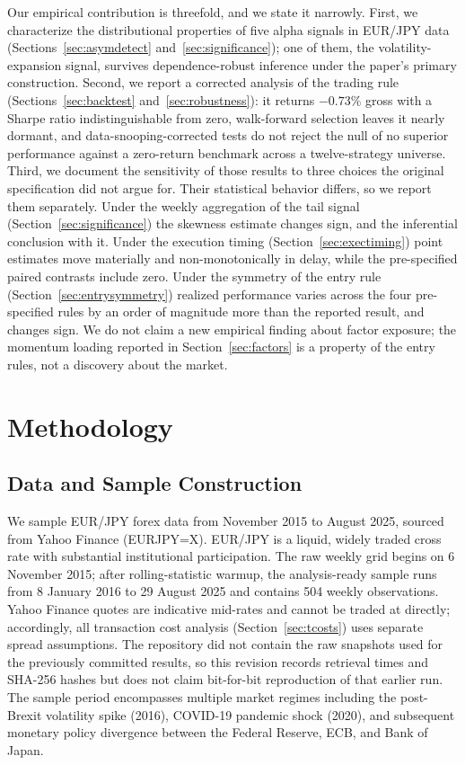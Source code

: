 \documentclass[11pt]{article}
\begin{document}
Our empirical contribution is threefold, and we state it narrowly. First, we characterize the distributional properties of five alpha signals in EUR/JPY data (Sections~\ref{sec:asymdetect} and~\ref{sec:significance}); one of them, the volatility-expansion signal, survives dependence-robust inference under the paper's primary construction. Second, we report a corrected analysis of the trading rule (Sections~\ref{sec:backtest} and~\ref{sec:robustness}): it returns $-0.73\%$ gross with a Sharpe ratio indistinguishable from zero, walk-forward selection leaves it nearly dormant, and data-snooping-corrected tests do not reject the null of no superior performance against a zero-return benchmark across a twelve-strategy universe. Third, we document the sensitivity of those results to three choices the original specification did not argue for. Their statistical behavior differs, so we report them separately. Under the weekly aggregation of the tail signal (Section~\ref{sec:significance}) the skewness estimate changes sign, and the inferential conclusion with it. Under the execution timing (Section~\ref{sec:exectiming}) point estimates move materially and non-monotonically in delay, while the pre-specified paired contrasts include zero. Under the symmetry of the entry rule (Section~\ref{sec:entrysymmetry}) realized performance varies across the four pre-specified rules by an order of magnitude more than the reported result, and changes sign. We do not claim a new empirical finding about factor exposure; the momentum loading reported in Section~\ref{sec:factors} is a property of the entry rules, not a discovery about the market.

\section{Methodology}

\subsection{Data and Sample Construction}
\label{sec:data}

We sample EUR/JPY forex data from November 2015 to August 2025, sourced from Yahoo Finance (EURJPY=X). EUR/JPY is a liquid, widely traded cross rate with substantial institutional participation. The raw weekly grid begins on 6 November 2015; after rolling-statistic warmup, the analysis-ready sample runs from 8 January 2016 to 29 August 2025 and contains 504 weekly observations. Yahoo Finance quotes are indicative mid-rates and cannot be traded at directly; accordingly, all transaction cost analysis (Section~\ref{sec:tcosts}) uses separate spread assumptions. The repository did not contain the raw snapshots used for the previously committed results, so this revision records retrieval times and SHA-256 hashes but does not claim bit-for-bit reproduction of that earlier run. The sample period encompasses multiple market regimes including the post-Brexit volatility spike (2016), COVID-19 pandemic shock (2020), and subsequent monetary policy divergence between the Federal Reserve, ECB, and Bank of Japan.
\end{document}
